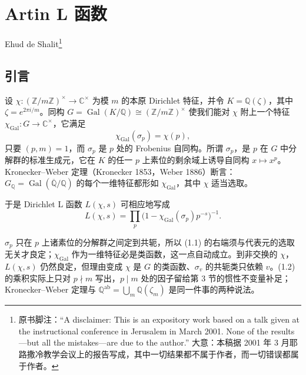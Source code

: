\chapter{Artin L 函数}\label{ch:04}

\begin{center}
Ehud de Shalit\footnote{原书脚注：“A disclaimer: This is an expository work based on a talk given at the instructional conference in Jerusalem in March 2001. None of the results---but all the mistakes---are due to the author.” 大意：本稿据 2001 年 3 月耶路撒冷教学会议上的报告写成，其中一切结果都不属于作者，而一切错误都属于作者。}
\end{center}

\let\chFourOldTheSection\thesection
\renewcommand{\thesection}{\arabic{section}}

\section{引言}\label{c4:sec:1}

设 $\chi\colon(\mathbb{Z}/m\mathbb{Z})^{\times}\to\mathbb{C}^{\times}$ 为模 $m$ 的本原 Dirichlet 特征，并令 $K=\mathbb{Q}(\zeta)$，其中 $\zeta=e^{2\pi i/m}$。同构 $G=\operatorname{Gal}(K/\mathbb{Q})\cong(\mathbb{Z}/m\mathbb{Z})^{\times}$ 使我们能对 $\chi$ 附上一个特征 $\chi_{\mathrm{Gal}}\colon G\to\mathbb{C}^{\times}$，它满足
\begin{equation}\tag{1.1}\label{c4:eq:1.1}
\chi_{\mathrm{Gal}}(\sigma_p)=\chi(p),
\end{equation}
只要 $(p,m)=1$，而 $\sigma_p$ 是 $p$ 处的 Frobenius 自同构。所谓 $\sigma_p$，是 $p$ 在 $G$ 中分解群的标准生成元，它在 $K$ 的任一 $p$ 上素位的剩余域上诱导自同构 $x\mapsto x^{p}$。Kronecker--Weber 定理（Kronecker 1853，Weber 1886）断言：$G_{\mathbb{Q}}=\operatorname{Gal}(\overline{\mathbb{Q}}/\mathbb{Q})$ 的每个一维特征都形如 $\chi_{\mathrm{Gal}}$，其中 $\chi$ 适当选取。

于是 Dirichlet L 函数 $L(\chi,s)$ 可相应地写成
\begin{equation}\tag{1.2}\label{c4:eq:1.2}
L(\chi,s)=\prod_{p}\bigl(1-\chi_{\mathrm{Gal}}(\sigma_p)p^{-s}\bigr)^{-1}.
\end{equation}

\begin{annote}
$\sigma_p$ 只在 $p$ 上诸素位的分解群之间定到共轭，所以 (1.1) 的右端须与代表元的选取无关才良定；$\chi_{\mathrm{Gal}}$ 作为一维特征必是类函数，这一点自动成立。到非交换的 $\chi$，$L(\chi,s)$ 仍然良定，但理由变成 $\chi$ 是 $G$ 的类函数、$\sigma_v$ 的共轭类只依赖 $v$。(1.2) 的乘积实际上只对 $p\nmid m$ 写出，$p\mid m$ 处的因子留给第 3 节的惯性不变量补足；Kronecker--Weber 定理与 $\mathbb{Q}^{\mathrm{ab}}=\bigcup_{m}\mathbb{Q}(\zeta_m)$ 是同一件事的两种说法。
\par\vspace{0.15em}{\raggedleft 【来源：Serre《A Course in Arithmetic》Ch.~VI--VII（A）；Neukirch《Algebraic Number Theory》Ch.~VI（A）】\par}
\end{annote}

